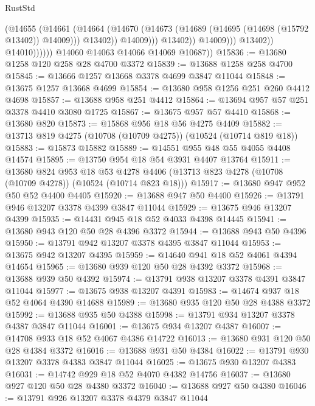 \begin{lexlean}{RustStd}
\begin{coremodule}
                                    (@14655
                                      (@14661
                                        (@14664
                                          (@14670
                                            (@14673
                                              (@14689 (@14695 (@14698 (@15792 @13402)) @14009)))
                                            @13402))
                                        @14009)))
                                  @13402))
                              @14009)))
                        @13402))
                    @14010))))))
        @14060
        @14063
        @14066
        @14069
        @10687))
@15836 := @13680 @1258 @120 @258 @28 @4700 @3372
@15839 := @13688 @1258 @258 @4700
@15845 := @13666 @1257 @13668 @3378 @4699 @3847 @11044
@15848 := @13675 @1257 @13668 @4699
@15854 := @13680 @958 @1256 @251 @260 @4412 @4698
@15857 := @13688 @958 @251 @4412
@15864 := @13694 @957 @57 @251 @3378 @4410 @3080 @1725
@15867 := @13675 @957 @57 @4410
@15868 := @13680 @820
@15873 := @15868 @956 @18 @56 @4275 @4409
@15882 := @13713 @819 @4275 (@10708 (@10709 @4275)) (@10524 (@10714 @819 @18))
@15883 := @15873 @15882
@15889 := @14551 @955 @48 @55 @4055 @4408 @14574
@15895 := @13750 @954 @18 @54 @3931 @4407 @13764
@15911 := @13680
    @824
    @953
    @18
    @53
    @4278
    @4406
    (@13713 @823 @4278 (@10708 (@10709 @4278)) (@10524 (@10714 @823 @18)))
@15917 := @13680 @947 @952 @50 @52 @4400 @4405
@15920 := @13688 @947 @50 @4400
@15926 := @13791 @946 @13207 @3378 @4399 @3847 @11044
@15929 := @13675 @946 @13207 @4399
@15935 := @14431 @945 @18 @52 @4033 @4398 @14445
@15941 := @13680 @943 @120 @50 @28 @4396 @3372
@15944 := @13688 @943 @50 @4396
@15950 := @13791 @942 @13207 @3378 @4395 @3847 @11044
@15953 := @13675 @942 @13207 @4395
@15959 := @14640 @941 @18 @52 @4061 @4394 @14654
@15965 := @13680 @939 @120 @50 @28 @4392 @3372
@15968 := @13688 @939 @50 @4392
@15974 := @13791 @938 @13207 @3378 @4391 @3847 @11044
@15977 := @13675 @938 @13207 @4391
@15983 := @14674 @937 @18 @52 @4064 @4390 @14688
@15989 := @13680 @935 @120 @50 @28 @4388 @3372
@15992 := @13688 @935 @50 @4388
@15998 := @13791 @934 @13207 @3378 @4387 @3847 @11044
@16001 := @13675 @934 @13207 @4387
@16007 := @14708 @933 @18 @52 @4067 @4386 @14722
@16013 := @13680 @931 @120 @50 @28 @4384 @3372
@16016 := @13688 @931 @50 @4384
@16022 := @13791 @930 @13207 @3378 @4383 @3847 @11044
@16025 := @13675 @930 @13207 @4383
@16031 := @14742 @929 @18 @52 @4070 @4382 @14756
@16037 := @13680 @927 @120 @50 @28 @4380 @3372
@16040 := @13688 @927 @50 @4380
@16046 := @13791 @926 @13207 @3378 @4379 @3847 @11044

\end{coremodule}
\end{lexlean}
